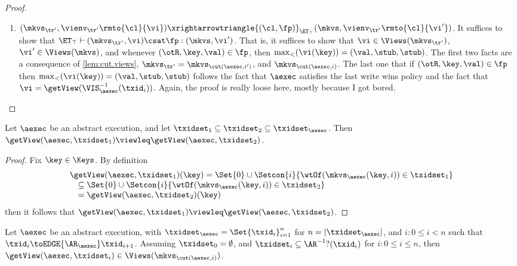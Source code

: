 \begin{proof}
\begin{itemize}
\begin{enumerate}
\item $(\mkvs_{\tr'}, \vienv_{\tr'}\rmto{\cl}{\vi}) \xrightarrowtriangle{(\cl, \fp)}_{\ET_{\top}} (\mkvs,  \vienv_{\tr'}\rmto{\cl}{\vi'})$. 
    It suffices to show that $\ET_{\top} \vdash (\mkvs_{\tr'}, \vi) \csat \fp: (\mkvs,\vi')$. 
That is, it suffices to show that $\vi \in \Views(\mkvs_{\tr'})$, $\vi' \in \Views(\mkvs)$, 
and whenever $(\otR, \key, \val) \in \fp$, then $\max_{<}(\vi(\key)) = (\val, \stub, \stub)$. 
The first two facts are a consequence of \cref{lem:cut.views}, $\mkvs_{\tr'} = \mkvs_{\cut(\aexec, i')}$, and  $\mkvs_{\cut(\aexec, i)}$. 
The last one that if $(\otR, \key, \val) \in \fp$ then $\max_{<}(\vi(\key)) = (\val, \stub, \stub)$ follows the fact that 
$\aexec$ satisfies the last write wins policy and the fact that $\vi = \getView(\VIS^{-1}_{\aexec}(\txid_{i}))$.
\ac{Again, the proof is really loose here, mostly because I got bored.}
\end{enumerate} 

\end{itemize}
\end{proof}

\begin{lemma}
\label{lem:getView.monotone}
Let $\aexec$ be an abstract execution, and let $\txidset_1 \subseteq \txidset_2 \subseteq \txidset_{\aexec}$. 
Then $\getView(\aexec, \txidset_1) \viewleq \getView(\aexec, \txidset_2)$.
\end{lemma}
\begin{proof}
Fix $\key \in \Keys$. By definition  
\[
\begin{array}{l}
    \getView(\aexec, \txidset_1)(\key) = \Set{0} \cup \Setcon{ i }{\wtOf(\mkvs_{\aexec}(\key, i)) \in \txidset_1} \\
    \quad \subseteq \Set{0} \cup \Setcon{i }{ \wtOf(\mkvs_{\aexec}(\key, i)) \in \txidset_2} \\
\quad = \getView(\aexec, \txidset_2)(\key)
\end{array}
\]
then it follows that  $\getView(\aexec, \txidset_1) \viewleq \getView(\aexec, \txidset_2)$.
\end{proof}

\begin{lemma}
\label{lem:cut.views}
Let $\aexec$ be an abstract execution, with $\txidset_{\aexec} = \Set{\txid_{i}}_{i = 1}^{n}$ for 
$n = \lvert \txidset_{\aexec} \rvert$, and \( i : 0 \leq i < n\) such that $\txid_{i} \toEDGE{\AR_{\aexec}} \txid_{i+1}$.
Assuming $\txidset_{0} = \emptyset$, and $\txidset_{i} \subseteq \AR^{-1}?(\txid_{i})$ for $i : 0 \leq i \leq n$,
then $\getView(\aexec, \txidset_{i}) \in \Views(\mkvs_{\cut(\aexec, i)})$.
\end{lemma}

